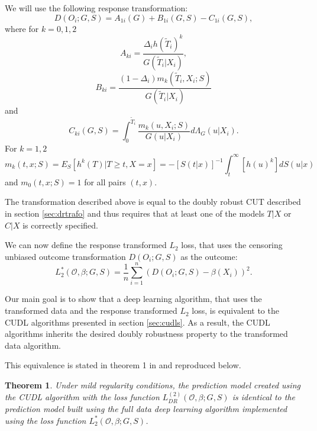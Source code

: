 \documentclass[12pt, a4paper]{article}
\theoremstyle{definition}
\theoremstyle{plain}
\newtheorem{Theorem}{Theorem}[section]
\numberwithin{equation}{section}
\numberwithin{figure}{section}
\numberwithin{table}{section}
\begin{document}
	
	We will use the following response transformation:
	\begin{equation*}
	D(O_i; G,S) = A_{1i}(G)+B_{1i}(G,S) - C_{1i}(G,S),
	\end{equation*}
	where for $k=0,1,2$
	\begin{equation*}
	A_{ki} = \frac{\Delta_i h(\tilde{T}_i)^k}{G(\tilde{T}_i\vert X_i)},
	\end{equation*}
	\begin{equation*}
	B_{ki} = \frac{(1-\Delta_i)m_k(\tilde{T}_i, X_i; S)}{G(\tilde{T}_i\vert X_i)}
	\end{equation*}
	and
	\begin{equation*}
	C_{ki} (G,S) = \int_{0}^{\tilde{T}_i} \frac{m_k(u, X_i; S)}{G(u \vert X_i)}d\Lambda_G(u \vert X_i).
	\end{equation*}
	For $k=1,2$
	\begin{equation*}
	m_k(t,x;S) = E_S[h^k(T) \vert T \geq t, X = x] = -[S(t\vert x)]^{-1} \int_{t}^{\infty}[h(u)^k]dS(u\vert x)
	\end{equation*}
	and $m_0(t,x;S) = 1$ for all pairs $(t,x)$.
	
	The transformation described above is equal to the doubly robust CUT described in section \ref{sec:drtrafo} and thus requires that at least one of the models $T\vert X$ or $C \vert X$ is correctly specified.
	
	We can now define the response transformed $L_2$ loss, that uses the censoring unbiased outcome transformation $D(O_i;G,S)$ as the outcome:
	\begin{equation*}
	L_2^*(\mathcal{O}, \beta; G,S) = \frac{1}{n} \sum_{i=1}^n (D(O_i;G,S)-\beta(X_i))^2.
	\end{equation*}
	
	Our main goal is to show that a deep learning algorithm, that uses the transformed data and the response transformed $L_2$ loss, is equivalent to the CUDL algorithms presented in section \ref{sec:cudls}.
	As a result, the CUDL algorithms inherits the desired doubly robustness property to the transformed data algorithm.
	
	This equivalence is stated in theorem 1 in \citet*{basearticle} and reproduced below.
	
	\begin{Theorem}\label{thm:equi}
		Under mild regularity conditions, the prediction model created using the CUDL algorithm with the loss function $L_{DR}^{(2)}(\mathcal{O}, \beta; G,S)$ is identical to the prediction model built using the full data deep learning algorithm implemented using the loss function $L_2^*(\mathcal{O}, \beta; G,S)$.
	\end{Theorem}
	
\end{document}
